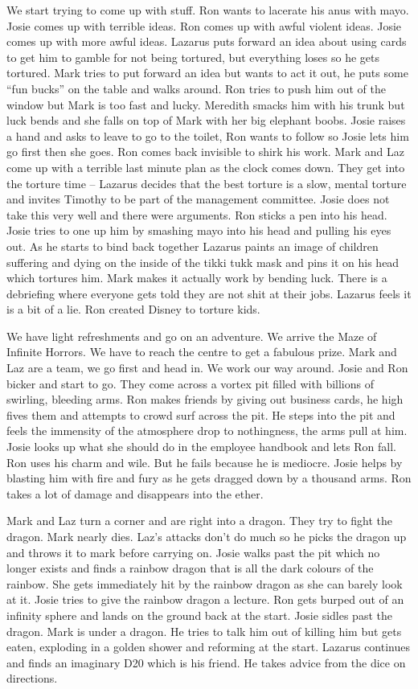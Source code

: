 We start trying to come up with stuff. Ron wants to lacerate his anus with mayo. Josie comes up with terrible ideas. Ron comes up with awful violent ideas. Josie comes up with more awful ideas. Lazarus puts forward an idea about using cards to get him to gamble for not being tortured, but everything loses so he gets tortured. Mark tries to put forward an idea but wants to act it out, he puts some “fun bucks” on the table and walks around. Ron tries to push him out of the window but Mark is too fast and lucky. Meredith smacks him with his trunk but luck bends and she falls on top of Mark with her big elephant boobs. Josie raises a hand and asks to leave to go to the toilet, Ron wants to follow so Josie lets him go first then she goes. Ron comes back invisible to shirk his work. Mark and Laz come up with a terrible last minute plan as the clock comes down. They get into the torture time – Lazarus decides that the best torture is a slow, mental torture and invites Timothy to be part of the management committee. Josie does not take this very well and there were arguments. Ron sticks a pen into his head. Josie tries to one up him by smashing mayo into his head and pulling his eyes out. As he starts to bind back together Lazarus paints an image of children suffering and dying on the inside of the tikki tukk mask and pins it on his head which tortures him. Mark makes it actually work by bending luck. There is a debriefing where everyone gets told they are not shit at their jobs. Lazarus feels it is a bit of a lie. Ron created Disney to torture kids.\medskip

We have light refreshments and go on an adventure. We arrive the Maze of Infinite Horrors. We have to reach the centre to get a fabulous prize. Mark and Laz are a team, we go first and head in. We work our way around. Josie and Ron bicker and start to go. They come across a vortex pit filled with billions of swirling, bleeding arms. Ron makes friends by giving out business cards, he high fives them and attempts to crowd surf across the pit. He steps into the pit and feels the immensity of the atmosphere drop to nothingness, the arms pull at him. Josie looks up what she should do in the employee handbook and lets Ron fall. Ron uses his charm and wile. But he fails because he is mediocre. Josie helps by blasting him with fire and fury as he gets dragged down by a thousand arms. Ron takes a lot of damage and disappears into the ether.\medskip

Mark and Laz turn a corner and are right into a dragon. They try to fight the dragon. Mark nearly dies. Laz’s attacks don’t do much so he picks the dragon up and throws it to mark before carrying on. Josie walks past the pit which no longer exists and finds a rainbow dragon that is all the dark colours of the rainbow. She gets immediately hit by the rainbow dragon as she can barely look at it. Josie tries to give the rainbow dragon a lecture. Ron gets burped out of an infinity sphere and lands on the ground back at the start. Josie sidles past the dragon. Mark is under a dragon. He tries to talk him out of killing him but gets eaten, exploding in a golden shower and reforming at the start. Lazarus continues and finds an imaginary D20 which is his friend. He takes advice from the dice on directions.\medskip

